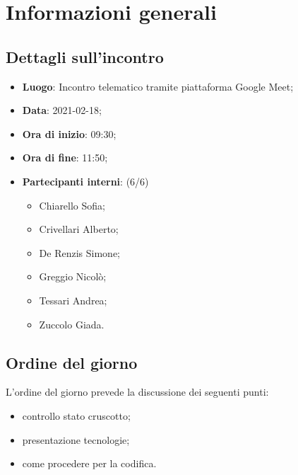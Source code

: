 \section{Informazioni generali}

\subsection{Dettagli sull'incontro}
\begin{itemize}
\item \textbf{Luogo}: Incontro telematico tramite piattaforma Google Meet;
\item \textbf{Data}: 2021-02-18;
\item \textbf{Ora di inizio}: 09:30;
\item \textbf{Ora di fine}: 11:50;
\item \textbf{Partecipanti interni}: (6/6)
\begin{itemize}
	\item Chiarello Sofia;
	\item Crivellari Alberto;
	\item De Renzis Simone;
	\item Greggio Nicolò;
	\item Tessari Andrea;
	\item Zuccolo Giada.
\end{itemize}
\end{itemize}

\subsection{Ordine del giorno}

L'ordine del giorno prevede la discussione dei seguenti punti:
\begin{itemize}
	\item controllo stato cruscotto;
    \item presentazione tecnologie;
    \item come procedere per la codifica.
\end{itemize}




